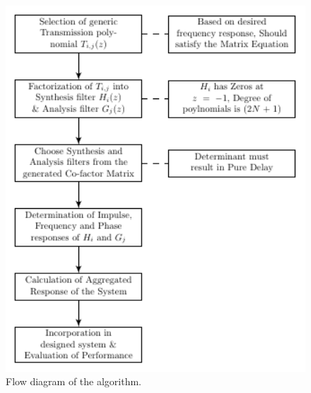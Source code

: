  \begin{figure}[htpb]
\centering
\includegraphics[width = 5in]{Design_algorithm.pdf}
\caption{Flow diagram of the algorithm.}
\label{algo}
\end{figure}

